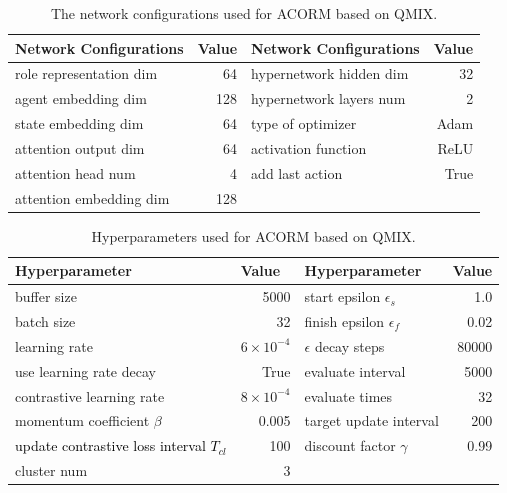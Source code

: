 \documentclass{article} %
\begin{document}
\begin{table}[h] \setlength{\tabcolsep}{5mm}
\caption{The network configurations used for ACORM based on QMIX.}
\label{network_config_acorm_qmix}
\begin{center}
\renewcommand{\arraystretch}{1.3}
\begin{tabular}{lrlr}
\hline 
\toprule[0.5pt]
\multicolumn{1}{l}{\bf Network Configurations}  &\multicolumn{1}{l}{\bf Value} &\multicolumn{1}{l}{\bf Network Configurations}  & \multicolumn{1}{l}{\bf Value} \\
\hline 
role representation dim     &64     &hypernetwork hidden dim        &32     \\
agent embedding dim         &128    &hypernetwork layers num        &2      \\
state embedding dim         &64     &type of optimizer              &Adam   \\
attention output dim        &64     &activation function            &ReLU   \\
attention head num          &4      &add last action                &True   \\
attention embedding dim     &128    &                               &       \\
\hline 
\toprule[0.5pt]
\end{tabular}
\end{center}
\end{table}



\begin{table}[h] \setlength{\tabcolsep}{5mm}
\caption{Hyperparameters used for ACORM based on QMIX.}
\label{para_acorm_qmix}
\begin{center}
\renewcommand{\arraystretch}{1.3}
\begin{tabular}{lrlr}
\hline 
\toprule[0.5pt]
\multicolumn{1}{l}{\bf Hyperparameter}  &\multicolumn{1}{l}{\bf Value} &\multicolumn{1}{l}{\bf Hyperparameter}  &\multicolumn{1}{l}{\bf Value}   \\
\hline 
buffer size                         &5000   &start epsilon $\epsilon_s$     &1.0     \\
batch size                          &32     &finish epsilon $\epsilon_f$    &0.02    \\
learning rate                       &$6\times 10^{-4}$   &$\epsilon$ decay steps         &80000   \\
use learning rate decay             &True   &evaluate interval              &5000    \\
contrastive learning rate          &$8\times 10^{-4}$    &evaluate times                 &32    \\
momentum coefficient $\beta$       &0.005   &target update interval         &200   \\
\textcolor{black}{update contrastive loss interval $T_{cl}$}   &100     &discount factor $\gamma$       &0.99  \\
cluster num                 &3      && \\
\hline 
\toprule[0.5pt]
\end{tabular}
\end{center}
\end{table}
\end{document}
